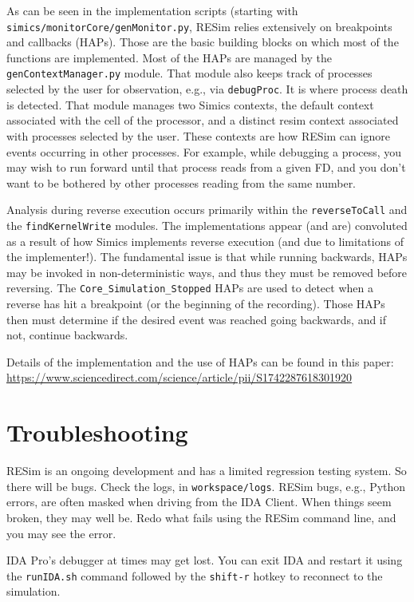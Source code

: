 \documentclass[titlepage]{article}
\begin{document}
As can be seen in the implementation scripts (starting with {\tt simics/monitorCore/genMonitor.py}, RESim relies extensively on breakpoints and callbacks (HAPs).  
Those are the basic building blocks on which most of the functions are implemented.  Most of the HAPs are managed by the {\tt genContextManager.py} module.  That module also
keeps track of processes selected by the user for observation, e.g., via {\tt debugProc}.  It is where process death is detected.  That module manages two Simics contexts,
the default context associated with the cell of the processor, and a distinct resim context associated with processes selected by the user.  These contexts are how RESim can 
ignore events occurring in other processes.  For example, while debugging a process, you may wish to run forward until that process reads from a given FD, and you don't want
to be bothered by other processes reading from the same number.

Analysis during reverse execution occurs primarily within the {\tt reverseToCall} and the {\tt findKernelWrite} modules.  The implementations appear (and are) convoluted as
a result of how Simics implements reverse execution (and due to limitations of the implementer!).  The fundamental issue is that while running backwards, HAPs may be
invoked in non-deterministic ways, and thus they must be removed before reversing.  The {\tt Core\_Simulation\_Stopped} HAPs are used to detect when a reverse has
hit a breakpoint (or the beginning of the recording).  Those HAPs then must determine if the desired event was reached going backwards, and if not, continue backwards. 

Details of the implementation and the use of HAPs can be found in this paper: \url{https://www.sciencedirect.com/science/article/pii/S1742287618301920}

\section{Troubleshooting}
\label{troubleshooting}
RESim is an ongoing development and has a limited regression testing system.  So there will be bugs.
Check the logs, in {\tt workspace/logs}.  
RESim bugs, e.g., Python errors, are often masked when driving from the IDA Client.  When things seem broken, they
may well be.  Redo what fails using the RESim command line, and you may see the error.

IDA Pro's debugger at times may get lost.  You can exit IDA and restart it using the {\tt runIDA.sh} command followed by the
{\tt shift-r} hotkey to reconnect to the simulation.
\end{document}
